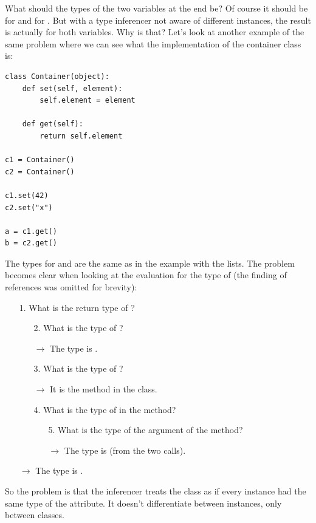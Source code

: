 \documentclass[12pt,halfparskip,DIV11,BCOR10mm]{scrreprt}
\begin{document}
What should the types of the two variables at the end be? Of course it should be  for  and  for . But with a type inferencer not aware of different instances, the result is actually  for both variables. Why is that? Let's look at another example of the same problem where we can see what the implementation of the container class is:

\begin{lstlisting}
class Container(object):
    def set(self, element):
        self.element = element

    def get(self):
        return self.element

c1 = Container()
c2 = Container()

c1.set(42)
c2.set("x")

a = c1.get()
b = c2.get()
\end{lstlisting}

The types for  and  are the same as in the example with the lists. The problem becomes clear when looking at the evaluation for the type of  (the finding of references was omitted for brevity):

\begin{enumerate}
	\item[1.] What is the return type of ?
	\begin{enumerate}
		\item[2.] What is the type of ?
		\item[] $\rightarrow$ The type is .
		\item[3.] What is the type of ?
		\item[] $\rightarrow$ It is the  method in the  class.
		\item[4.] What is the type of  in the  method?
		\begin{enumerate}
			\item [5.] What is the type of the  argument of the  method?
			\item [] $\rightarrow$ The type is  (from the two  calls).
		\end{enumerate}
	\end{enumerate}
	\item [] $\rightarrow$ The type is .
\end{enumerate}

So the problem is that the inferencer treats the  class as if every instance had the same type of the  attribute. It doesn't differentiate between instances, only between classes.
\end{document}
